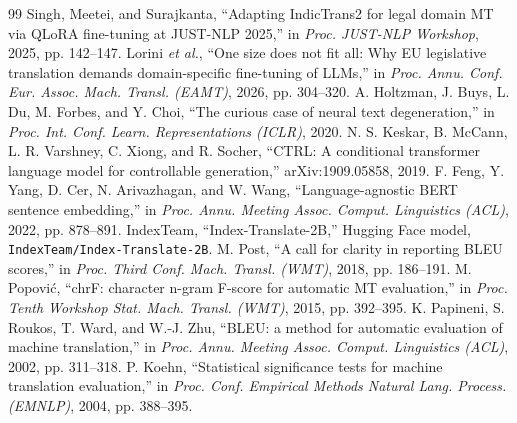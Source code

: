 \documentclass[conference]{IEEEtran}
\begin{document}
\begin{thebibliography}{99}
 Singh, Meetei, and Surajkanta, ``Adapting IndicTrans2 for legal domain MT via QLoRA fine-tuning at JUST-NLP 2025,'' in \emph{Proc. JUST-NLP Workshop}, 2025, pp. 142--147. %
 Lorini \emph{et al.}, ``One size does not fit all: Why EU legislative translation demands domain-specific fine-tuning of LLMs,'' in \emph{Proc. Annu. Conf. Eur. Assoc. Mach. Transl. (EAMT)}, 2026, pp. 304--320. %
 A. Holtzman, J. Buys, L. Du, M. Forbes, and Y. Choi, ``The curious case of neural text degeneration,'' in \emph{Proc. Int. Conf. Learn. Representations (ICLR)}, 2020.
 N. S. Keskar, B. McCann, L. R. Varshney, C. Xiong, and R. Socher, ``CTRL: A conditional transformer language model for controllable generation,'' arXiv:1909.05858, 2019.
 F. Feng, Y. Yang, D. Cer, N. Arivazhagan, and W. Wang, ``Language-agnostic BERT sentence embedding,'' in \emph{Proc. Annu. Meeting Assoc. Comput. Linguistics (ACL)}, 2022, pp. 878--891.
 IndexTeam, ``Index-Translate-2B,'' Hugging Face model, \texttt{IndexTeam/Index-Translate-2B}. %
 M. Post, ``A call for clarity in reporting BLEU scores,'' in \emph{Proc. Third Conf. Mach. Transl. (WMT)}, 2018, pp. 186--191.
 M. Popovi\'{c}, ``chrF: character n-gram F-score for automatic MT evaluation,'' in \emph{Proc. Tenth Workshop Stat. Mach. Transl. (WMT)}, 2015, pp. 392--395.
 K. Papineni, S. Roukos, T. Ward, and W.-J. Zhu, ``BLEU: a method for automatic evaluation of machine translation,'' in \emph{Proc. Annu. Meeting Assoc. Comput. Linguistics (ACL)}, 2002, pp. 311--318.
 P. Koehn, ``Statistical significance tests for machine translation evaluation,'' in \emph{Proc. Conf. Empirical Methods Natural Lang. Process. (EMNLP)}, 2004, pp. 388--395.
\end{thebibliography}
\end{document}
